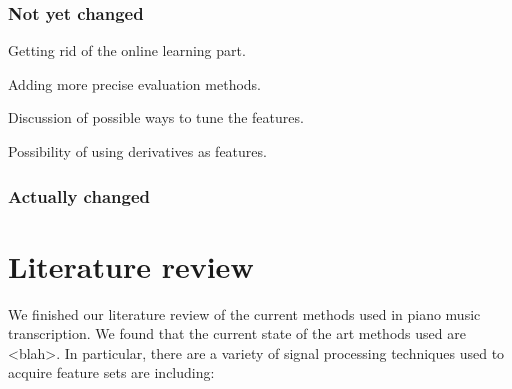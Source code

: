 \documentclass{article}
\begin{document}
\subsubsection{Not yet changed}
Getting rid of the online learning part.

Adding more precise evaluation methods.

Discussion of possible ways to tune the features.

Possibility of using derivatives as features.

\subsubsection{Actually changed}


\section{Literature review}
We finished our literature review of the current methods used in piano music
transcription. We found that the current state of the art methods used are
<blah>. In particular, there are a variety of signal processing techniques used
to acquire feature sets are including:
\end{document}
